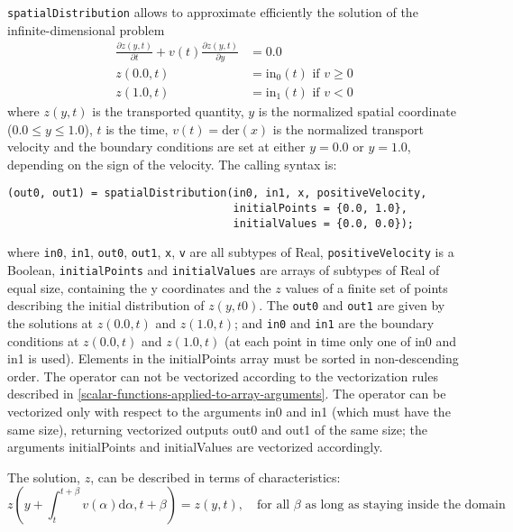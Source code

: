 \lstinline!spatialDistribution! allows to approximate efficiently the solution of the infinite-dimensional problem
\begin{align*}
\frac{\partial z(y,t)}{\partial t}+v(t)\frac{\partial z(y,t)}{\partial y} &= 0.0\\
z(0.0, t) &= \mathrm{in}_0(t) \text{ if $v\ge 0$}\\
z(1.0, t) &= \mathrm{in}_1(t) \text{ if $v<0$}
\end{align*}
where $z(y, t)$ is the transported quantity, $y$ is the
normalized spatial coordinate ($0.0 \le y \le 1.0$), $t$ is the
time, $v(t)=\mathrm{der}(x)$ is the normalized
transport velocity and the boundary conditions are set at either
$y=0.0$ or $y=1.0$, depending on the sign of the velocity.
The calling syntax is:
\begin{lstlisting}[language=modelica]
(out0, out1) = spatialDistribution(in0, in1, x, positiveVelocity,
                                   initialPoints = {0.0, 1.0},
                                   initialValues = {0.0, 0.0});
\end{lstlisting}
where \lstinline!in0!, \lstinline!in1!, \lstinline!out0!, \lstinline!out1!, \lstinline!x!, \lstinline!v! are all subtypes of Real,
\lstinline!positiveVelocity! is a Boolean, \lstinline!initialPoints! and \lstinline!initialValues! are
arrays of subtypes of Real of equal size, containing the y coordinates
and the $z$ values of a finite set of points describing the initial
distribution of $z(y, \mathit{t0})$. The \lstinline!out0! and \lstinline!out1! are given by
the solutions at $z(0.0, t)$ and $z(1.0, t)$; and \lstinline!in0! and \lstinline!in1!
are the boundary conditions at $z(0.0, t)$ and $z(1.0, t)$ (at
each point in time only one of in0 and in1 is used). Elements in the
initialPoints array must be sorted in non-descending order. The operator
can not be vectorized according to the vectorization rules described in
\autoref{scalar-functions-applied-to-array-arguments}. The operator can be vectorized only with respect to the
arguments in0 and in1 (which must have the same size), returning
vectorized outputs out0 and out1 of the same size; the arguments
initialPoints and initialValues are vectorized accordingly.

The solution, $z$, can be described in terms of characteristics:
\begin{equation*}
z(y+\int_{t}^{t+\beta} v(\alpha) \mathrm{d}\alpha, t+\beta) = z(y, t),\quad\text{for all $\beta$ as long as staying inside the domain}
\end{equation*}

